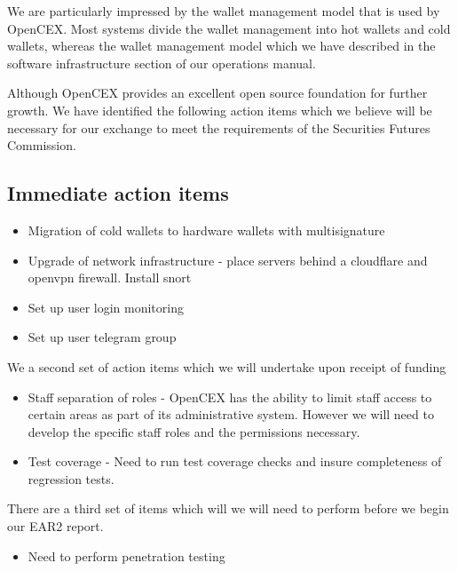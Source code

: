 \documentclass[]{report}
\begin{document}
We are particularly impressed by the wallet management model that is
used by OpenCEX.  Most systems divide the wallet management into hot
wallets and cold wallets, whereas the wallet management model which we
have described in the software infrastructure section of our
operations manual.

Although OpenCEX provides an excellent open source foundation for
further growth.  We have identified the following action items which
we believe will be necessary for our exchange to meet the requirements
of the Securities Futures Commission.

\subsection{Immediate action items}

\begin{itemize}
\item Migration of cold wallets to hardware wallets with multisignature

\item Upgrade of network infrastructure - place servers behind a cloudflare and
openvpn firewall.  Install snort

\item Set up user login monitoring

\item Set up user telegram group
\end{itemize}

We a second set of action items which we will undertake upon receipt
of funding

\begin{itemize}

\item Staff separation of roles - OpenCEX has the ability to limit
  staff access to certain areas as part of its administrative system.
  However we will need to develop the specific staff roles and the
  permissions necessary.

\item Test coverage - Need to run test coverage checks and insure
  completeness of regression tests.

\end{itemize}

There are a third set of items which will we will need to perform
before we begin our EAR2 report.

\begin{itemize}
\item Need to perform penetration testing
\end{itemize}
\end{document}

